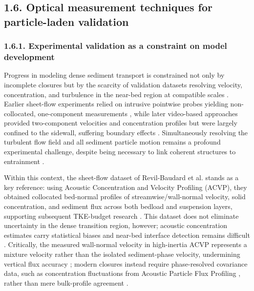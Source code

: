\subsection{1.6. Optical measurement techniques for particle-laden validation}

\subsubsection{1.6.1. Experimental validation as a constraint on model development}

Progress in modeling dense sediment transport is constrained not only by incomplete closures but by the scarcity of validation datasets resolving velocity, concentration, and turbulence in the near-bed region at compatible scales \cite{elghannay__2018}. Earlier sheet-flow experiments relied on intrusive pointwise probes yielding non-collocated, one-component measurements \cite{PEND_Donoghue2004,revil-baudard__2015,PEND_Sumer1996}, while later video-based approaches provided two-component velocities and concentration profiles but were largely confined to the sidewall, suffering boundary effects \cite{PEND_Capart2011,PEND_Lajeunesse2010,PEND_Spinewine2011}. Simultaneously resolving the turbulent flow field and all sediment particle motion remains a profound experimental challenge, despite being necessary to link coherent structures to entrainment \cite{PEND_Cellino2004,PEND_Nio1996,revil-baudard__2015}.

Within this context, the sheet-flow dataset of Revil-Baudard et al. \cite{revil-baudard__2015} stands as a key reference: using Acoustic Concentration and Velocity Profiling (ACVP), they obtained collocated bed-normal profiles of streamwise/wall-normal velocity, solid concentration, and sediment flux across both bedload and suspension layers, supporting subsequent TKE-budget research \cite{PEND_Fromant2019,guta__2024}. This dataset does not eliminate uncertainty in the dense transition region, however; acoustic concentration estimates carry statistical biases and near-bed interface detection remains difficult \cite{revil-baudard__2015,PEND_Thorne2014}. Critically, the measured wall-normal velocity in high-inertia ACVP represents a mixture velocity rather than the isolated sediment-phase velocity, undermining vertical flux accuracy \cite{guta__2024}; modern closures instead require phase-resolved covariance data, such as concentration fluctuations from Acoustic Particle Flux Profiling \cite{PEND_Cellino2004}, rather than mere bulk-profile agreement \cite{PEND_Toorman2003}.

